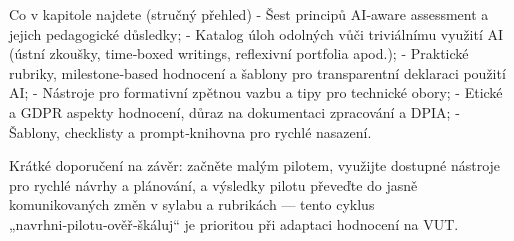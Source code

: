 Co v kapitole najdete (stručný přehled)
- Šest principů AI‑aware assessment a jejich pedagogické důsledky;  
- Katalog úloh odolných vůči triviálnímu využití AI (ústní zkoušky, time‑boxed writings, reflexivní portfolia apod.);  
- Praktické rubriky, milestone‑based hodnocení a šablony pro transparentní deklaraci použití AI;  
- Nástroje pro formativní zpětnou vazbu a tipy pro technické obory;  
- Etické a GDPR aspekty hodnocení, důraz na dokumentaci zpracování a DPIA;  
- Šablony, checklisty a prompt‑knihovna pro rychlé nasazení.

Krátké doporučení na závěr: začněte malým pilotem, využijte dostupné nástroje pro rychlé návrhy a plánování, a výsledky pilotu převeďte do jasně komunikovaných změn v sylabu a rubrikách — tento cyklus „navrhni‑pilotu‑ověř‑škáluj“ je prioritou při adaptaci hodnocení na VUT. \cite{kb_ai_101_tipu_pdf_04e4a115_page_48_1,kb_ai_101_tipu_pdf_04e4a115_page_15_2,kb_ai_101_tipu_pdf_04e4a115_page_8_1}